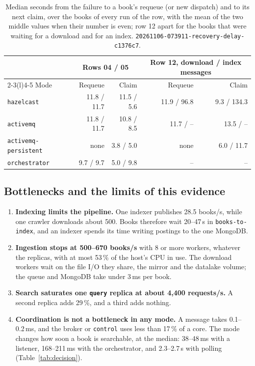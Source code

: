 \documentclass[11pt,a4paper]{article}
\newcommand{\code}[1]{\nolinkurl{#1}}
\newcommand{\mode}[1]{\code{#1}}
\newcommand{\run}[1]{\nolinkurl{#1}}
\begin{document}
\begin{table}[ht]
\centering
\small
\caption{Median seconds from the failure to a book's requeue (or new dispatch) and to its next claim, over the books
of every run of the row, with the mean of the two middle values when their number is even; row 12 apart for the books
that were waiting for a download and for an index. \run{20261106-073911-recovery-delay-c1376c7}.}
\label{tab:delay}
\setlength{\tabcolsep}{4.5pt}
\begin{tabular}{@{}lrrrr@{}}
\toprule
& \multicolumn{2}{c}{Rows 04 / 05} & \multicolumn{2}{c}{Row 12, download / index messages} \\
\cmidrule(lr){2-3}\cmidrule(l){4-5}
Mode & Requeue & Claim & Requeue & Claim \\
\midrule
\mode{hazelcast} & 11.8 / 11.7 & 11.5 / 5.6 & 11.9 / 96.8 & 9.3 / 134.3 \\
\mode{activemq} & 11.8 / 11.7 & 10.8 / 8.5 & 11.7 / -- & 13.5 / -- \\
\mode{activemq-persistent} & none & 3.8 / 5.0 & none & 6.0 / 11.7 \\
\mode{orchestrator} & 9.7 / 9.7 & 5.0 / 9.8 & -- & -- \\
\bottomrule
\end{tabular}
\end{table}

\subsection{Bottlenecks and the limits of this evidence}
\label{sec:limits}

\begin{enumerate}
\item \textbf{Indexing limits the pipeline.} One indexer publishes 28.5 books/s, while one crawler downloads about 500.
  Books therefore wait 20--47\,s in \code{books-to-index}, and an indexer spends its time writing postings to the one
  MongoDB.
\item \textbf{Ingestion stops at 500--670 books/s} with 8 or more workers, whatever the replicas, with at most 53\,\% of
  the host's CPU in use. The download workers wait on the file I/O they share, the mirror and the datalake volume; the
  queue and MongoDB take under 3\,ms per book.
\item \textbf{Search saturates one \code{query} replica at about 4{,}400 requests/s.} A second replica adds 29\,\%,
  and a third adds nothing.
\item \textbf{Coordination is not a bottleneck in any mode.} A message takes 0.1--0.2\,ms, and the broker or
  \code{control} uses less than 17\,\% of a core. The mode changes how soon a book is searchable, at the median:
  38--48\,ms with a listener, 168--211\,ms with the orchestrator, and 2.3--2.7\,s with polling
  (Table~\ref{tab:decision}).
\end{enumerate}
\end{document}
